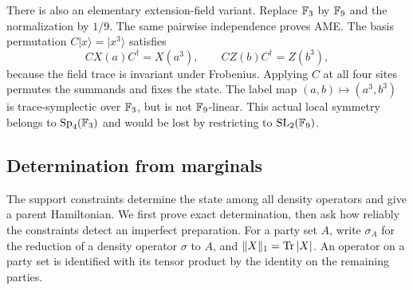 There is also an elementary extension-field variant.  Replace \(\mathbb F_3\) by
\(\mathbb F_9\) and the normalization by \(1/9\).  The same pairwise independence
proves AME.  The basis permutation \(C|x\rangle=|x^3\rangle\) satisfies
\[
 CX(a)C^\dagger=X(a^3),\qquad CZ(b)C^\dagger=Z(b^3),
\]
because the field trace is invariant under Frobenius.  Applying \(C\) at
all four sites permutes the summands and fixes the state.  The label map
\((a,b)\mapsto(a^3,b^3)\) is trace-symplectic over \(\mathbb F_3\), but is not
\(\mathbb F_9\)-linear.  This actual local symmetry belongs to
\(\operatorname{Sp}_4(\mathbb F_3)\) and would be lost by restricting to
\(\mathrm{SL}_2(\mathbb F_9)\).

\subsection{Determination from marginals}
\label{subsec:marginal-certification}

The support constraints determine the state among all density operators
and give a parent Hamiltonian.  We first prove exact determination, then
ask how reliably the constraints detect an imperfect preparation.
For a party set \(A\), write
\(\sigma_A\) for the reduction of a density operator \(\sigma\) to \(A\),
and \(\|X\|_1=\operatorname{Tr}|X|\).  An operator on a party set is identified with its
tensor product by the identity on the remaining parties.

